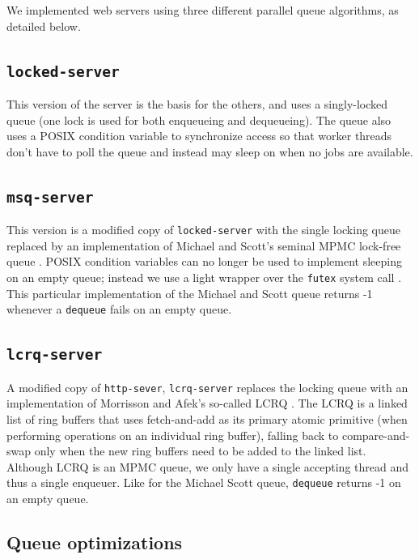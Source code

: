 \documentclass[twoside,10pt]{article}
\begin{document}
\begin{multicols}{2}
We implemented web servers using three different parallel queue
algorithms, as detailed below.

\subsection{\texttt{locked-server}}

This version of the server is the basis for the others, and uses a
singly-locked queue (one lock is used for both enqueueing and
dequeueing). The queue also uses a POSIX condition variable to synchronize
access so that worker threads don't have to poll the queue and instead may
sleep on when no jobs are available.

\subsection{\texttt{msq-server}}

This version is a modified copy of \verb+locked-server+ with the single
locking queue replaced by an implementation of Michael and Scott's
seminal MPMC lock-free queue \cite{synch-1.0.1}. POSIX
condition variables can no longer be used to implement sleeping on an
empty queue; instead we use a light wrapper over the \verb+futex+ system
call \cite{drepper2005futexes}. This particular implementation of the Michael and Scott queue
returns -1 whenever a \verb+dequeue+ fails on an empty queue. 

\subsection{\texttt{lcrq-server}}

A modified copy of \verb+http-sever+, \verb+lcrq-server+ replaces the
locking queue with an implementation of Morrisson and Afek's so-called
LCRQ \cite{lcrq-source}. The LCRQ is a linked list of ring buffers
that uses fetch-and-add as its primary atomic primitive (when
performing operations on an individual ring buffer), falling back to
compare-and-swap only when the new ring buffers need to be added to
the linked list. Although LCRQ is an MPMC queue, we only have a single
accepting thread and thus a single enqueuer. Like for the Michael
Scott queue, \verb+dequeue+ returns -1 on an empty queue.

\subsection{Queue optimizations}


\end{multicols}
\end{document}
